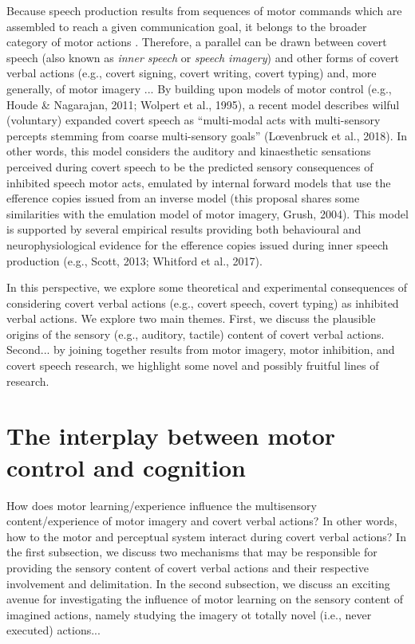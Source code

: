 \documentclass[utf8]{template/frontiersSCNS} %
\begin{document}
Because speech production results from sequences of motor commands which are assembled to reach a given communication goal, it belongs to the broader category of motor actions \citep{jeannerod_motor_2006}. Therefore, a parallel can be drawn between covert speech (also known as \textit{inner speech} or \textit{speech imagery}) and other forms of covert verbal actions (e.g., covert signing, covert writing, covert typing) and, more generally, of motor imagery \citep{alderson-day_inner_2015, perrone-bertolotti_what_2014, loevenbruck_cognitive_2018}... By building upon models of motor control (e.g., Houde \& Nagarajan, 2011; Wolpert et al., 1995), a recent model describes wilful (voluntary) expanded covert speech as “multi-modal acts with multi-sensory percepts stemming from coarse multi-sensory goals” (L\oe venbruck et al., 2018). In other words, this model considers the auditory and kinaesthetic sensations perceived during covert speech to be the predicted sensory consequences of inhibited speech motor acts, emulated by internal forward models that use the efference copies issued from an inverse model (this proposal shares some similarities with the emulation model of motor imagery, Grush, 2004). This model is supported by several empirical results providing both behavioural and neurophysiological evidence for the efference copies issued during inner speech production (e.g., Scott, 2013; Whitford et al., 2017).

In this perspective, we explore some theoretical and experimental consequences of considering covert verbal actions (e.g., covert speech, covert typing) as inhibited verbal actions. We explore two main themes. First, we discuss the plausible origins of the sensory (e.g., auditory, tactile) content of covert verbal actions. Second... by joining together results from motor imagery, motor inhibition, and covert speech research, we highlight some novel and possibly fruitful lines of research.

\section{The interplay between motor control and cognition}

How does motor learning/experience influence the multisensory content/experience of motor imagery and covert verbal actions? In other words, how to the motor and perceptual system interact during covert verbal actions? In the first subsection, we discuss two mechanisms that may be responsible for providing the sensory content of covert verbal actions and their respective involvement and delimitation. In the second subsection, we discuss an exciting avenue for investigating the influence of motor learning on the sensory content of imagined actions, namely studying the imagery ot totally novel (i.e., never executed) actions...
\end{document}
